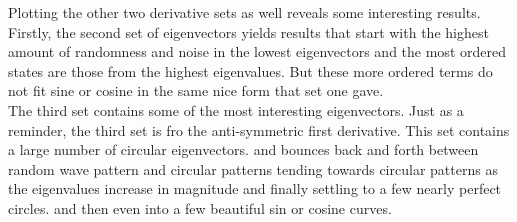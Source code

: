 \documentclass[12pt]{article}
\begin{document}
Plotting the other two derivative sets as well reveals some interesting results. Firstly, the second set of eigenvectors yields results that start with the highest amount of randomness and noise in the lowest eigenvectors and the most ordered states are those from the highest eigenvalues. But these more ordered terms do not fit sine or cosine in the same nice form that set one gave.\\

The third set contains some of the most interesting eigenvectors. Just as a reminder, the third set is fro the anti-symmetric first derivative. This set contains a large number of circular eigenvectors. and bounces back and forth between random wave pattern and circular patterns tending towards circular patterns as the eigenvalues increase in magnitude and finally settling to a few nearly perfect circles. and then even into a few beautiful sin or cosine curves.\\
\end{document}
